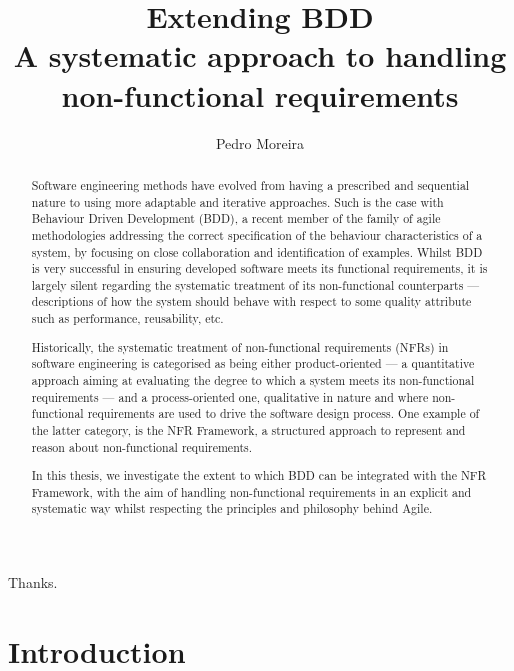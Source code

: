 \documentclass[dissertation]{softeng}
\title{Extending BDD\\A systematic approach to handling non-functional requirements}
\author{Pedro Moreira}
\begin{document}
\maketitle

\begin{abstract}
Software engineering methods have evolved from having a prescribed and sequential nature to using more adaptable and iterative approaches. Such is the case with Behaviour Driven Development (BDD), a recent member of the family of agile methodologies addressing the correct specification of the behaviour characteristics of a system, by focusing on close collaboration and identification of examples.
Whilst BDD is very successful in ensuring developed software meets its functional requirements, it is largely silent regarding the systematic treatment of its non-functional counterparts --- descriptions of how the system should behave with respect to some quality attribute such as performance, reusability, etc.

Historically, the systematic treatment of non-functional requirements (NFRs) in software engineering is categorised as being either product-oriented --- a quantitative approach aiming at evaluating the degree to which a system meets its non-functional requirements --- and a process-oriented one, qualitative in nature and where non-functional requirements are used to drive the software design process.
One example of the latter category, is the NFR Framework\cite{Chung2000}, a structured approach to represent and reason about non-functional requirements. 

In this thesis, we investigate the extent to which BDD can be integrated with the NFR Framework, with the aim of handling non-functional requirements in an explicit and systematic way whilst respecting the principles and philosophy behind Agile.
\end{abstract}

\clearpage

\begin{acknowledgements}
  Thanks.  
\end{acknowledgements}

\clearpage

\pagestyle{plain}
\setcounter{tocdepth}{2}

\tableofcontents

\clearpage

\pagestyle{myheadings}

\chapter{Introduction}
\end{document}
